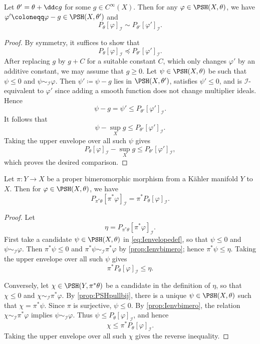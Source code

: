 \begin{proposition}\label{prop:Ienvindeptheta}
    Let $\theta'=\theta+\ddc g$ for some $g\in C^{\infty}(X)$. Then for any $\varphi\in \PSH(X,\theta)$, we have $\varphi'\coloneqq \varphi-g\in \PSH(X,\theta')$ and
    \[
        P_{\theta}[\varphi]_{\mathcal{I}}\sim P_{\theta'}[\varphi']_{\mathcal{I}}.
    \]
\end{proposition}
\begin{proof}
    By symmetry, it suffices to show that
    \[
        P_{\theta}[\varphi]_{\mathcal{I}}\preceq P_{\theta'}[\varphi']_{\mathcal{I}}.
    \]
    After replacing $g$ by $g+C$ for a suitable constant $C$, which only changes $\varphi'$ by an additive constant, we may assume that $g\geq 0$.
    Let $\psi\in \PSH(X,\theta)$ be such that $\psi\leq 0$ and $\psi\sim_{\mathcal{I}}\varphi$. Then $\psi'\coloneqq \psi-g$ lies in $\PSH(X,\theta')$, satisfies $\psi'\leq 0$, and is $\mathcal{I}$-equivalent to $\varphi'$ since adding a smooth function does not change multiplier ideals. Hence
    \[
        \psi-g=\psi'\leq P_{\theta'}[\varphi']_{\mathcal{I}}.
    \]
    It follows that
    \[
        \psi-\sup_X g\leq P_{\theta'}[\varphi']_{\mathcal{I}}.
    \]
    Taking the upper envelope over all such $\psi$ gives
    \[
        P_{\theta}[\varphi]_{\mathcal{I}}-\sup_X g\leq P_{\theta'}[\varphi']_{\mathcal{I}},
    \]
    which proves the desired comparison.
\end{proof}

\begin{proposition}\label{prop:Ienvelopebimero}
    Let $\pi\colon Y\rightarrow X$ be a proper bimeromorphic morphism from a Kähler manifold $Y$ to $X$. Then for $\varphi \in \PSH(X,\theta)$, we have
    \[
        P_{\pi^*\theta}[\pi^*\varphi]_{\mathcal{I}}=\pi^* P_{\theta}[\varphi]_{\mathcal{I}}.
    \]
\end{proposition}
\begin{proof}
    Let
    \[
        \eta=P_{\pi^*\theta}[\pi^*\varphi]_{\mathcal{I}}.
    \]
    First take a candidate $\psi\in \PSH(X,\theta)$ in \eqref{eq:Ienvelopedef}, so that $\psi\leq 0$ and $\psi\sim_{\mathcal{I}}\varphi$. Then $\pi^*\psi\leq 0$ and $\pi^*\psi\sim_{\mathcal{I}}\pi^*\varphi$ by \cref{prop:Ienvbimero}; hence $\pi^*\psi\leq \eta$. Taking the upper envelope over all such $\psi$ gives
    \[
        \pi^* P_{\theta}[\varphi]_{\mathcal{I}}\leq \eta.
    \]

    Conversely, let $\chi\in \PSH(Y,\pi^*\theta)$ be a candidate in the definition of $\eta$, so that $\chi\leq 0$ and $\chi\sim_{\mathcal{I}}\pi^*\varphi$. By \cref{prop:PSHpullbij}, there is a unique $\psi\in \PSH(X,\theta)$ such that $\chi=\pi^*\psi$. Since $\pi$ is surjective, $\psi\leq 0$. By \cref{prop:Ienvbimero}, the relation $\chi\sim_{\mathcal{I}}\pi^*\varphi$ implies $\psi\sim_{\mathcal{I}}\varphi$. Thus $\psi\leq P_{\theta}[\varphi]_{\mathcal{I}}$, and hence
    \[
        \chi\leq \pi^* P_{\theta}[\varphi]_{\mathcal{I}}.
    \]
    Taking the upper envelope over all such $\chi$ gives the reverse inequality.
\end{proof}

